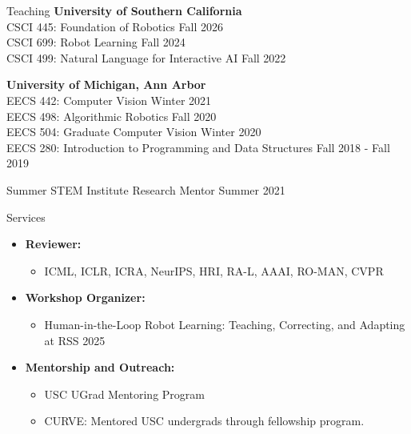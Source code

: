 \documentclass{resume}
\begin{document}
\begin{rSection}{Teaching}
\textbf{University of Southern California} \\
CSCI 445: Foundation of Robotics \hfill Fall 2026 \\
CSCI 699: Robot Learning \hfill Fall 2024 \\
CSCI 499: Natural Language for Interactive AI \hfill Fall 2022 

\textbf{University of Michigan, Ann Arbor} \\ 
EECS 442: Computer Vision \hfill Winter 2021 \\
EECS 498: Algorithmic Robotics \hfill Fall 2020 \\
EECS 504: Graduate Computer Vision \hfill Winter 2020 \\
EECS 280: Introduction to Programming and Data Structures \hfill Fall 2018 - Fall 2019

Summer STEM Institute Research Mentor \hfill Summer 2021
\end{rSection}


\begin{rSection}{Services}
\begin{itemize}[leftmargin=*]
    \item[] \textbf{Reviewer:}
    \begin{itemize}
        \item ICML, ICLR, ICRA, NeurIPS, HRI, RA-L, AAAI, RO-MAN, CVPR
    \end{itemize}
    
    \item[] \textbf{Workshop Organizer:}
    \begin{itemize}
        \item Human-in-the-Loop Robot Learning: Teaching, Correcting, and Adapting at RSS 2025
    \end{itemize}
    
    \item[] \textbf{Mentorship and Outreach:}
    \begin{itemize}
        \item USC UGrad Mentoring Program
        \item CURVE: Mentored USC undergrads through fellowship program.
    \end{itemize}
    
\end{itemize}
\end{rSection}
\end{document}
